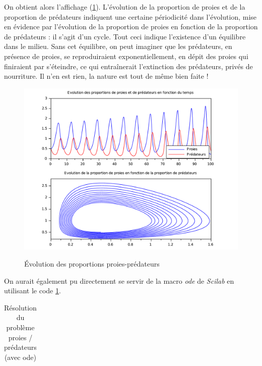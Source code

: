 \documentclass[a4paper,10pt]{report}
\begin{document}
On obtient alors l'affichage (\ref{aff_proie-predateur}). L'évolution de la proportion de proies et de la proportion de prédateurs indiquent une certaine périodicité dans l'évolution, mise en évidence par l'évolution de la proportion de proies en fonction de la proportion de prédateurs : il s'agit d'un cycle. Tout ceci indique l'existence d'un équilibre dans le milieu. Sans cet équilibre, on peut imaginer que les prédateurs, en présence de proies, se reproduiraient exponentiellement, en dépit des proies qui finiraient par s'éteindre, ce qui entraînerait l’extinction des prédateurs, privés de nourriture. Il n'en est rien, la nature est tout de même bien faite !
\begin{figure}[H]
\centering
\caption{Évolution des proportions proies-prédateurs}
\includegraphics[width=\textwidth]{proie-predateur.pdf}
\label{aff_proie-predateur}
\end{figure}

On aurait également pu directement se servir de la macro \textit{ode} de \textit{Scilab} en utilisant le code \ref{code_proie-predateur_ode}. 
\begin{table}[H]
\caption{Résolution du problème proies / prédateurs (avec ode)}
\begin{tabular}{l}

\label{code_proie-predateur_ode}
\end{tabular}
\end{table}
\end{document}
